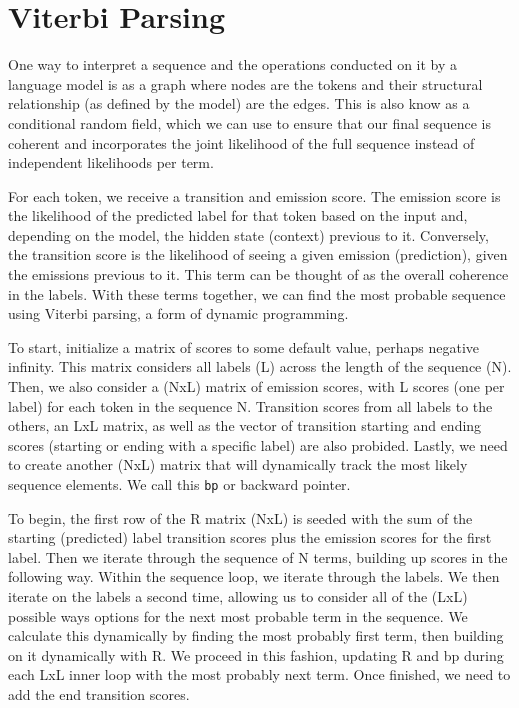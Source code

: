 \documentclass[11pt,a4paper]{article}
\begin{document}
\section{Viterbi Parsing}%
\label{sec:viterbi_parsing}

One way to interpret a sequence and the operations conducted on it by a language model is as a graph where nodes are the tokens and their structural relationship (as defined by the model) are the edges. This is also know as a conditional random field, which we can use to ensure that our final sequence is coherent and incorporates the joint likelihood of the full sequence instead of independent likelihoods per term. 

For each token, we receive a transition and emission score. The emission score is the likelihood of the predicted label for that token based on the input and, depending on the model, the hidden state (context) previous to it. Conversely, the transition score is the likelihood of seeing a given emission (prediction), given the emissions previous to it. This term can be thought of as the overall coherence in the labels. With these terms together, we can find the most probable sequence using Viterbi parsing, a form of dynamic programming.

To start, initialize a matrix of scores to some default value, perhaps negative infinity. This matrix considers all labels (L) across the length of the sequence (N). Then, we also consider a (NxL) matrix of emission scores, with L scores (one per label) for each token in the sequence N. Transition scores from all labels to the others, an LxL matrix, as well as the vector of transition starting and ending scores (starting or ending with a specific label) are also probided. Lastly, we need to create another (NxL) matrix that will dynamically track the most likely sequence elements. We call this \texttt{bp} or backward pointer.

To begin, the first row of the R matrix (NxL) is seeded with the sum of the starting (predicted) label transition scores plus the emission scores for the first label. Then we iterate through the sequence of N terms, building up scores in the following way. Within the sequence loop, we iterate through the labels. We then iterate on the labels a second time, allowing us to consider all of the (LxL) possible ways options for the next most probable term in the sequence. We calculate this dynamically by finding the most probably first term, then building on it dynamically with R. We proceed in this fashion, updating R and bp during each LxL inner loop with the most probably next term. Once finished, we need to add the end transition scores. 
\end{document}
